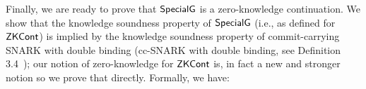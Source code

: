 
\noindent Finally, we are ready to prove that ${\mathsf{SpecialG}}$ is a zero-knowledge continuation. We show that the knowledge soundness property 
of ${\mathsf{SpecialG}}$ (i.e., as defined for ${\mathsf{ZKCont}}$) is implied by the knowledge soundness property of commit-carrying SNARK with double 
binding (cc-SNARK with double binding, see Definition 3.4~\cite{LegoSNARK}); our notion of zero-knowledge for ${\mathsf{ZKCont}}$ is, in fact a 
new and stronger notion so we prove that directly. Formally, we have: 

